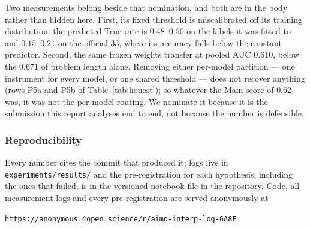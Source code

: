 \documentclass[10pt]{article}
\begin{document}
Two measurements belong beside that nomination, and both are in the body rather than hidden here.
First, its fixed threshold is miscalibrated off its training distribution: the predicted True rate
is $0.48$--$0.50$ on the labels it was fitted to and $0.15$--$0.21$ on the official 33, where its
accuracy falls below the constant predictor. Second, the same frozen weights transfer at pooled AUC
$0.610$, below the $0.671$ of problem length alone. Removing either per-model partition --- one
instrument for every model, or one shared threshold --- does not recover anything (rows P5a and P5b
of Table~\ref{tab:honest}); so whatever the Main score of $0.62$ was, it was not the per-model
routing. We nominate it because it is the submission this report analyses end to end, not because
the number is defensible.

\subsubsection*{Reproducibility}
Every number cites the commit that produced it; logs live in \texttt{experiments/results/} and the
pre-registration for each hypothesis, including the ones that failed, is in the versioned notebook
file in the repository. Code, all measurement logs and every pre-registration are served
anonymously at
\begin{center}
\texttt{https://\allowbreak anonymous.4open.science/\allowbreak r/\allowbreak aimo-interp-log-6A8E}
\end{center}
\end{document}
